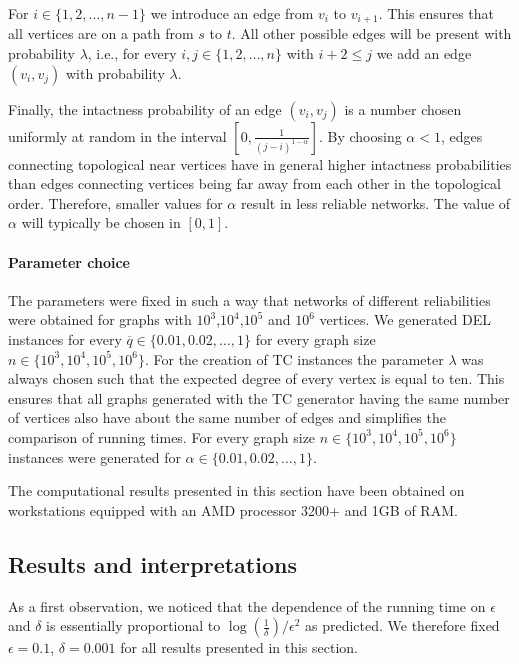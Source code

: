 \documentclass{article}
\begin{document}
For $i\in\{1,2,\dots,n-1\}$ we introduce an edge from $v_i$ to $v_{i+1}$. This
ensures that all vertices are on a path from $s$ to $t$.
All other possible edges will be present
with probability $\lambda$, i.e., for every $i,j\in\{1,2,\dots,n\}$ with $i+2\leq j$
we add an edge $(v_i,v_j)$ with probability $\lambda$.

Finally, the intactness probability of an edge $(v_i,v_j)$ is a number chosen
uniformly at random in the interval $[0,\frac{1}{(j-i)^{1-\alpha}}]$. By choosing
$\alpha < 1$, edges connecting topological near vertices have in general higher
intactness probabilities than edges connecting vertices being far away from each
other in the topological order. Therefore, smaller values for $\alpha$
result in less reliable networks. The value of $\alpha$ will typically be
chosen in $[0,1]$.

\paragraph{Parameter choice}

The parameters were fixed in such a way that networks of different reliabilities
were obtained for graphs with $10^3$,$10^4$,$10^5$ and $10^6$ vertices.
We generated DEL instances
for every
$\overline{q}\in\{0.01,0.02,\dots,1\}$ for every graph size $n\in\{10^3,10^4,10^5,10^6\}$.
For the creation of TC instances
the parameter $\lambda$ was always chosen such that the expected degree of
every vertex is equal to ten. This ensures that all graphs generated with the TC
generator having the same number of vertices also have about the same number of edges
and simplifies the comparison of running times. For every graph size $n\in\{10^3,10^4,10^5,10^6\}$
instances were generated for $\alpha\in\{0.01,0.02,\dots,1\}$.

The computational results presented in this section have been obtained on workstations
equipped with an AMD processor 3200+ and 1GB of RAM.

\subsection{Results and interpretations}

As a first observation, we noticed that the dependence of the running time
on $\epsilon$ and $\delta$ is essentially proportional to
$\log(\frac{1}{\delta})/{\epsilon^2}$ as predicted. We therefore
fixed $\epsilon=0.1$, $\delta=0.001$ for all results presented in this section.
\end{document}
